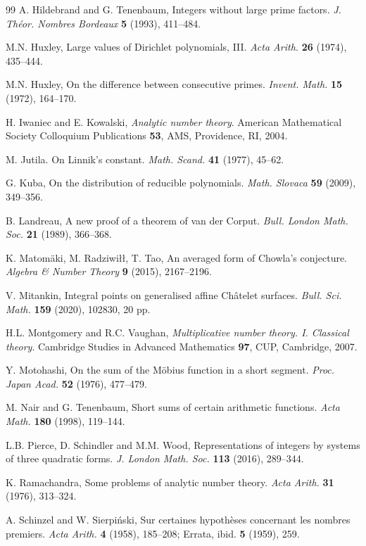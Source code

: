 \documentclass[11pt,letterpaper]{amsart}
\theoremstyle{definition}
\numberwithin{equation}{section}
\newcommand{\0}{\mathbf{0}}
\begin{document}
\begin{thebibliography}{99}
A. Hildebrand and G. Tenenbaum, 
Integers without large prime factors.
{\em J. Th\'eor. Nombres Bordeaux} {\bf 5} (1993), 411--484.

M.N. Huxley, Large values of Dirichlet polynomials, III. {\em Acta Arith.} {\bf 26} (1974), 435--444.

 M.N. Huxley, On the difference between consecutive primes. {\em Invent. Math.} {\bf 15} (1972), 164--170. 


H. Iwaniec and E.  Kowalski,
{\em Analytic number theory}.
American Mathematical Society Colloquium Publications {\bf 53},
AMS, Providence, RI, 2004.

M. Jutila. On Linnik’s constant. {\em Math. Scand.} {\bf 41} (1977), 45--62.

G. Kuba, On the distribution of reducible polynomials. {\em Math. Slovaca} {\bf 59} (2009), 349--356.

B. Landreau, 
A new proof of a theorem of van der Corput.
{\em Bull. London Math. Soc.} {\bf 21} (1989), 
366--368.

K. Matom\"aki, M. Radziwiłł, T. Tao,
An averaged form of Chowla's conjecture. {\em 
Algebra \& Number Theory} {\bf 9} (2015), 2167--2196.


V. Mitankin, 
Integral points on generalised affine Ch\^atelet surfaces. 
{\em Bull. Sci. Math.} {\bf 159} (2020), 102830, 20 pp.

H.L. Montgomery and R.C. Vaughan, 
{\em Multiplicative number theory. {I}. {C}lassical theory}.
Cambridge Studies in Advanced Mathematics {\bf 97},
CUP, Cambridge, 2007.

 Y. Motohashi, On the sum of the {M}\"{o}bius function in a short segment. {\em Proc. Japan Acad.} {\bf 52} (1976), 477--479.

M. Nair and G.  Tenenbaum, 
Short sums of certain arithmetic functions. 
{\em Acta Math.} {\bf 180} (1998), 119--144.

L.B. Pierce,  D. Schindler and M.M. Wood,
Representations of integers by systems of three quadratic forms. {\em J. London Math. Soc.} {\bf 113} (2016), 289--344.

K. Ramachandra, 
Some problems of analytic number theory.
{\em Acta Arith.} {\bf 31} (1976), 313--324.

A. Schinzel and W. Sierpi\'nski,  Sur certaines hypoth\`eses concernant les nombres premiers. {\em Acta Arith.} {\bf 4}
(1958), 185--208; Errata, ibid. {\bf 5} (1959), 259.


\end{thebibliography}
\end{document}
